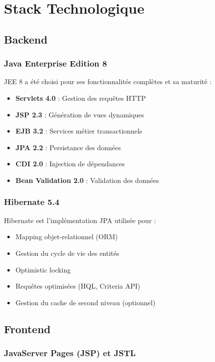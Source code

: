 \documentclass[12pt,a4paper,twoside]{report}
\begin{document}
\section{Stack Technologique}

\subsection{Backend}

\subsubsection{Java Enterprise Edition 8}

JEE 8 a été choisi pour ses fonctionnalités complètes et sa maturité :
\begin{itemize}
    \item \textbf{Servlets 4.0} : Gestion des requêtes HTTP
    \item \textbf{JSP 2.3} : Génération de vues dynamiques
    \item \textbf{EJB 3.2} : Services métier transactionnels
    \item \textbf{JPA 2.2} : Persistance des données
    \item \textbf{CDI 2.0} : Injection de dépendances
    \item \textbf{Bean Validation 2.0} : Validation des données
\end{itemize}

\subsubsection{Hibernate 5.4}

Hibernate est l'implémentation JPA utilisée pour :
\begin{itemize}
    \item Mapping objet-relationnel (ORM)
    \item Gestion du cycle de vie des entités
    \item Optimistic locking
    \item Requêtes optimisées (HQL, Criteria API)
    \item Gestion du cache de second niveau (optionnel)
\end{itemize}

\subsection{Frontend}

\subsubsection{JavaServer Pages (JSP) et JSTL}
\end{document}

